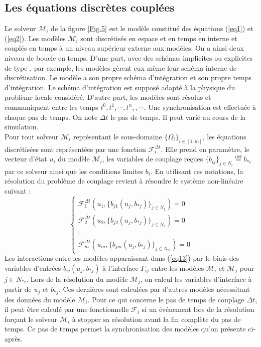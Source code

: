 \documentclass[11pt,a4paper]{scrartcl}%
\begin{document}
	\subsection{ Les équations discrètes couplées}\label{sec6}
	Le solveur $\mathcal{M}_i$ de la figure \ref{Fig.5} est le modèle constitué des équations (\ref{eq1}) et (\ref{eq2}). Les modèles $\mathcal{M}_i$ sont discrétisés en espace et en temps en interne et couplés en temps à un niveau supérieur externe aux modèles. On a ainsi deux niveau de boucle en temps. D'une part, avec des schémas implicites ou explicites de type ,  par exemple, les modèles gèrent eux même leur schéma interne de discrétisation. Le modèle a son propre schéma d'intégration et son propre temps d'intégration. Le schéma d'intégration est supposé adapté à la physique du problème locale considéré. D'autre part, les modèles sont résolus et communiquent entre les temps $t^0, t^1,\cdots, t^n,, \cdots$. Une synchronisation est effectuée à chaque pas de temps. On note $\Delta t$ le pas de temps. Il peut varié au cours de la simulation. \\
	Pour tout solveur $\mathcal{M}_i$ représentant le sous-domaine $\{\Omega_i\}_{i\in[1,m]}$, les équations discrétisées sont représentées par une fonction $\mathcal{F}^{\Delta t}_i$. Elle prend en paramètre, le vecteur d'état $u_i$  du modèle $\mathcal{M}_i$, les variables de couplage reçues $\{b_{ij}\}_{j\in N_i} \overset{\text{déf}}{=} b_{*i}$ par ce solveur ainsi que les conditions limites $b_i$. En utilisant ces notations, la résolution du problème de couplage revient à résoudre le système non-linéaire suivant :
	\begin{equation}\label{eq13}
	\begin{cases}
	\mathcal{F}^{\Delta t}_1(u_1, \{b_{j1}(u_j,b_{*j})\}_{j\in N_1}) = 0\\
	\mathcal{F}^{\Delta t}_2(u_2, \{b_{j2}(u_j,b_{*j})\}_{j\in N_2}) = 0\\
	\vdots\\
	\mathcal{F}^{\Delta t}_m(u_m, \{b_{jm}(u_j,b_{*j})\}_{j\in N_m}) = 0
	\end	{cases}
	\end{equation}
	Les interactions entre les modèles apparaissant dans (\ref{eq13}) par le biais des variables d'entrées $b_{ij}(u_j,b_{*j})$ à l'interface $\Gamma_{ij}$ entre les modèles $\mathcal{M}_i$ et $\mathcal{M}_j$ pour $j\in N_{*i}$. Lors de la résolution du modèle $\mathcal{M}_j$, on calcul les variables d'interface à partir de $u_j$ et $b_{*j}$. Ces dernières sont calculées par d'autres modèles nécessitant des données du modèle $\mathcal{M}_i$. Pour ce qui concerne le pas de temps de couplage $\Delta t$, il peut être calculé par une fonctionnelle $\mathcal{F}_i$ si un événement lors de la résolution forçant le solveur $\mathcal{M}_i$ à stopper sa résolution avant la fin complète du pas de temps. Ce pas de temps permet la synchronisation des modèles qu'on présente ci-après.\\
\end{document}
